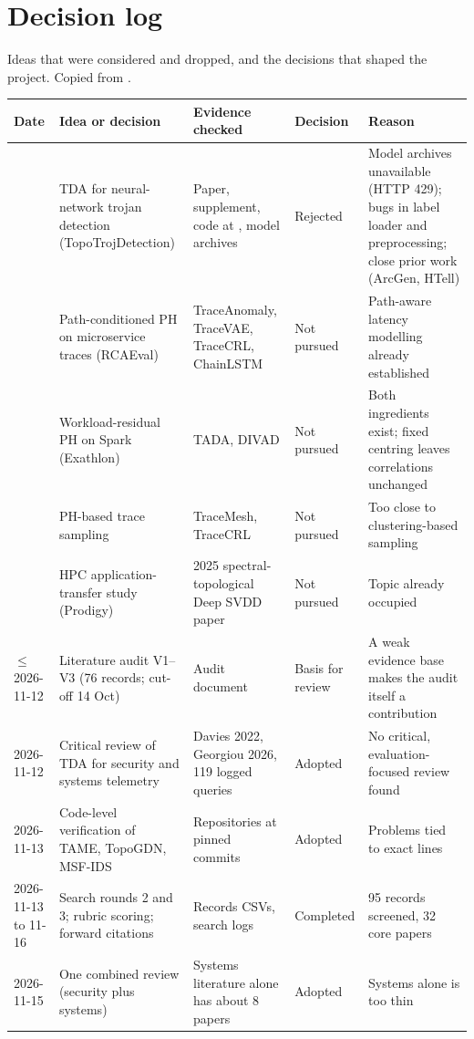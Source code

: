 \section{Decision log}
\label{app:decisions}
Ideas that were considered and dropped, and the decisions that shaped the project. Copied from .

{\small\setlength{\tabcolsep}{4pt}
\begin{longtable}{@{}L{1.9cm}L{4.1cm}L{3.5cm}L{1.6cm}L{3.6cm}@{}}
\toprule
Date & Idea or decision & Evidence checked & Decision & Reason \\
\midrule
\endhead
{} & TDA for neural-network trojan detection (TopoTrojDetection) & Paper, supplement, code at , model archives & Rejected & Model archives unavailable (HTTP 429); bugs in label loader and preprocessing; close prior work (ArcGen, HTell) \\
 & Path-conditioned PH on microservice traces (RCAEval) & TraceAnomaly, TraceVAE, TraceCRL, ChainLSTM & Not pursued & Path-aware latency modelling already established \\
 & Workload-residual PH on Spark (Exathlon) & TADA, DIVAD & Not pursued & Both ingredients exist; fixed centring leaves correlations unchanged \\
 & PH-based trace sampling & TraceMesh, TraceCRL & Not pursued & Too close to clustering-based sampling \\
 & HPC application-transfer study (Prodigy) & 2025 spectral-topological Deep SVDD paper & Not pursued & Topic already occupied \\
$\le$ 2026-11-12 & Literature audit V1--V3 (76 records; cut-off 14 Oct) & Audit document & Basis for review & A weak evidence base makes the audit itself a contribution \\
2026-11-12 & Critical review of TDA for security and systems telemetry & Davies 2022, Georgiou 2026, 119 logged queries & Adopted & No critical, evaluation-focused review found \\
2026-11-13 & Code-level verification of TAME, TopoGDN, MSF-IDS & Repositories at pinned commits & Adopted & Problems tied to exact lines \\
2026-11-13 to 11-16 & Search rounds 2 and 3; rubric scoring; forward citations & Records CSVs, search logs & Completed & 95 records screened, 32 core papers \\
2026-11-15 & One combined review (security plus systems) & Systems literature alone has about 8 papers & Adopted & Systems alone is too thin \\

\end{longtable}}

